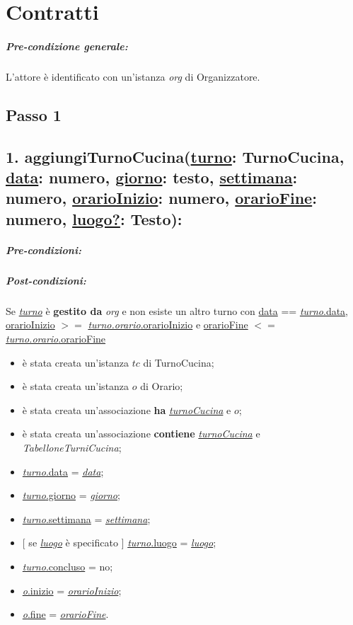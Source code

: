 \chapter{Contratti}
\paragraph{Pre-condizione generale:} L'attore è identificato con un'istanza \textit{org} di Organizzatore.

\section{Passo 1}
\section*{1. aggiungiTurnoCucina(\underline{turno}: TurnoCucina, \underline{data}: numero, \underline{giorno}: testo, \underline{settimana}: numero, \underline{orarioInizio}: numero, \underline{orarioFine}: numero, \underline{luogo?}: Testo):}

\paragraph{Pre-condizioni:} 


\paragraph{Post-condizioni:} Se \underline{\textit{turno}} è \textbf{gestito da} \textit{org} e non esiste un altro turno con \underline{data} == \underline{\textit{turno}.data}, \underline{orarioInizio} $>=$ \underline{\textit{turno.orario}.orarioInizio} e \underline{orarioFine} $<=$ \underline{\textit{turno.orario}.orarioFine}

\begin{itemize}
    \item è stata creata un'istanza $tc$ di TurnoCucina;
    \item è stata creata un'istanza $o$ di Orario;
    \item è stata creata un'associazione \textbf{ha} \underline{\textit{turnoCucina}} e $o$;
    \item è stata creata un'associazione \textbf{contiene} \underline{\textit{turnoCucina}} e \textit{TabelloneTurniCucina};
    \item \underline{\textit{turno}.data} = \underline{\textit{data}};
    \item \underline{\textit{turno}.giorno} = \underline{\textit{giorno}};
    \item \underline{\textit{turno}.settimana} = \underline{\textit{settimana}};
    \item $[$ se \underline{\textit{luogo}} è specificato $]$ \underline{\textit{turno}.luogo} = \underline{\textit{luogo}};
    \item \underline{\textit{turno}.concluso}  = no;
    \item \underline{\textit{o}.inizio}  = \underline{\textit{orarioInizio}};
    \item \underline{\textit{o}.fine}  = \underline{\textit{orarioFine}}.
    
\end{itemize}

